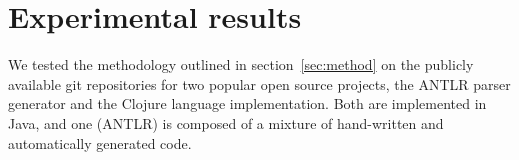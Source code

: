 \section{Experimental results}

We tested the methodology outlined in section~\ref{sec:method} on the
publicly available git repositories for two popular open source
projects, the ANTLR parser generator and the Clojure language implementation.
Both are implemented in Java, and one (ANTLR) is composed of a mixture of
hand-written and automatically generated code.  


